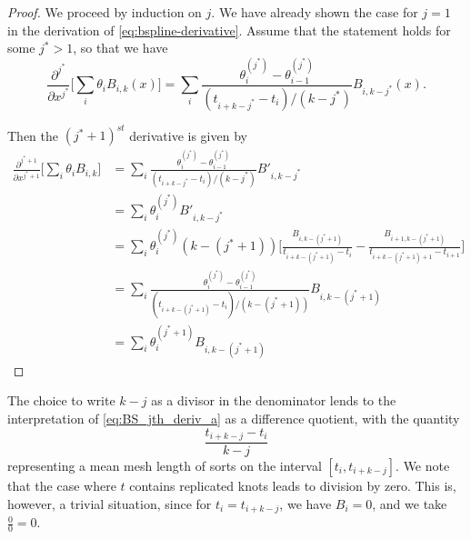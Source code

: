 \begin{proof}
We proceed by induction on $j$. We have already shown the case for $j=1$ in the derivation of \ref{eq:bspline-derivative}. Assume that the statement holds for some $j^* >1$, so that we have
\[
\frac{\partial^{j^*}}{\partial x^{j^*}} \bigg[ \sum_i \theta_i B_{i,k}\left(x\right) \bigg] = \sum_i \frac{\theta_i^{\left(j^*\right)} - \theta_{i-1}^{\left(j^*\right)} }{\left( t_{i+k-{j^*}}-t_{i}\right)/\left(k-{j^*}\right)} B_{i,k-j^*}\left(x\right).
\]

\noindent
Then the $\left( j^* + 1 \right)^{st}$ derivative is given by 
\begin{align*}
\frac{\partial^{j^*+1}}{\partial x^{j^*+1}} \bigg[ \sum_i \theta_i B_{i,k} \bigg] &= \sum_i \frac{\theta_i^{\left(j^*\right)} - \theta_{i-1}^{\left(j^*\right)} }{\left( t_{i+k-{j^*}}-t_{i}\right)/\left(k-{j^*}\right)}  B'_{i,k-j^*} \\
&= \sum_i \theta_i^{\left(j^*\right)}  B'_{i,k-j^*} \\
&= \sum_i \theta_i^{\left(j^*\right)} \left(k-\left(j^*+1\right)\right)\bigg[ \frac{B_{i,k-\left(j^*+1\right)}}{t_{i+k-\left({j^*}+1\right)}-t_{i}} - \frac{ B_{i+1,k-\left(j^*+1\right)} }{ t_{i+k-\left({j^*}+1\right)+1}-t_{i+1}} \bigg] \\
&= \sum_i \frac{\theta_i^{\left(j^*\right)} - \theta_{i-1}^{\left(j^*\right)}}{\left(t_{i+k-\left(j^* + 1\right)}-t_i\right)/\left(k-\left(j^*+1\right)\right)}B_{i,k-\left(j^* + 1\right)}\\
&= \sum_i \theta_i^{\left(j^*+1\right)}  B_{i,k-\left(j^* + 1\right)}
\end{align*}
\end{proof}
The choice to write $k-j$ as a divisor in the denominator lends to the interpretation of \ref{eq:BS_jth_deriv_a} as a difference quotient, with the quantity
\[
\frac{t_{i+k-j} - t_i}{k-j}
\]
representing a mean mesh length of sorts on the interval $\left[t_i,t_{i+k-j}\right]$. We note that the case where $t$ contains replicated knots leads to division by zero. This is, however, a trivial situation, since for $t_i = t_{i+k-j}$, we have $B_i = 0$, and we take $\frac{0}{0} = 0$.



